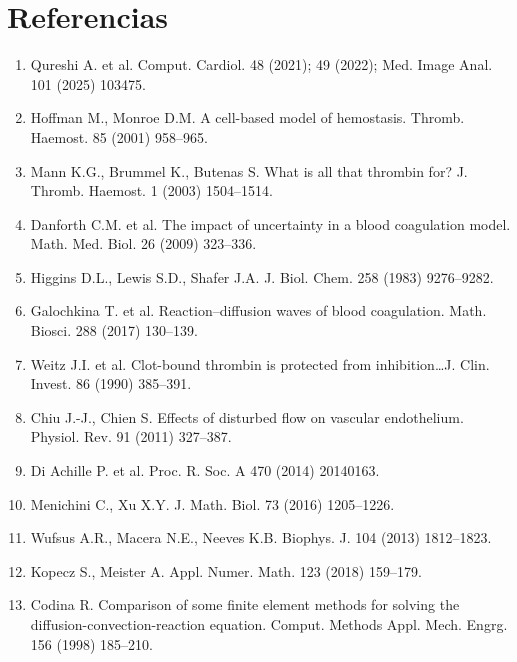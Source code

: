 \documentclass[11pt,a4paper]{article}
\begin{document}
\section*{Referencias}
\begin{enumerate}\small
\item Qureshi A. et al. Comput. Cardiol. 48 (2021); 49 (2022); Med. Image Anal. 101 (2025) 103475.
\item Hoffman M., Monroe D.M. A cell-based model of hemostasis. Thromb. Haemost. 85 (2001) 958--965.
\item Mann K.G., Brummel K., Butenas S. What is all that thrombin for? J. Thromb. Haemost. 1 (2003) 1504--1514.
\item Danforth C.M. et al. The impact of uncertainty in a blood coagulation model. Math. Med. Biol. 26 (2009) 323--336.
\item Higgins D.L., Lewis S.D., Shafer J.A. J. Biol. Chem. 258 (1983) 9276--9282.
\item Galochkina T. et al. Reaction--diffusion waves of blood coagulation. Math. Biosci. 288 (2017) 130--139.
\item Weitz J.I. et al. Clot-bound thrombin is protected from inhibition\ldots J. Clin. Invest. 86 (1990) 385--391.
\item Chiu J.-J., Chien S. Effects of disturbed flow on vascular endothelium. Physiol. Rev. 91 (2011) 327--387.
\item Di Achille P. et al. Proc. R. Soc. A 470 (2014) 20140163.
\item Menichini C., Xu X.Y. J. Math. Biol. 73 (2016) 1205--1226.
\item Wufsus A.R., Macera N.E., Neeves K.B. Biophys. J. 104 (2013) 1812--1823.
\item Kopecz S., Meister A. Appl. Numer. Math. 123 (2018) 159--179.
\item Codina R. Comparison of some finite element methods for solving the diffusion-convection-reaction equation. Comput. Methods Appl. Mech. Engrg. 156 (1998) 185--210.
\end{enumerate}
\end{document}
